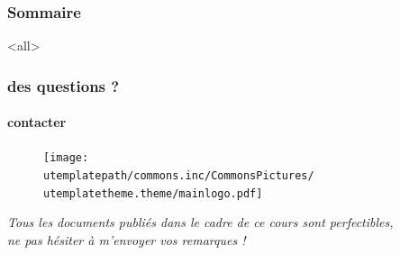 \begin{frame}
 \frametitle{Sommaire}
      \begin{multicols}{2}
         \tableofcontents[hideallsubsections]
     \end{multicols}
 \end{frame}

\mode<all>{\ubody}

\begin{frame}
 \frametitle{des questions ?}
  \framesubtitle{contacter \umaila}
  					\begin{figure}
  					 \centering
   						 \texttt{[image: \\utemplatepath/commons.inc/CommonsPictures/\\utemplatetheme.theme/mainlogo.pdf]}\\
				  \end{figure}
				 	 \centering \textit{Tous les documents publiés dans le cadre de ce cours sont perfectibles, \\ne pas hésiter à m'envoyer vos remarques !}
 \end{frame}

